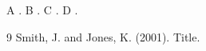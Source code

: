 \documentclass{article}
\begin{document}
A \citealt[e.g.][]{a}. B \citealp[e.g.][]{a}. C \citealt[p.~5]{a}. D \citealp[e.g.][p.~3]{a}.
\begin{thebibliography}{9}
 Smith, J. and Jones, K. (2001). Title.
\end{thebibliography}
\end{document}
